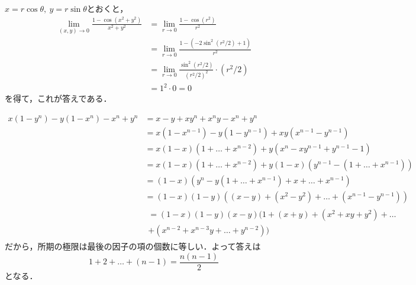 
\begin{tanswer}
    $x=r \cos \theta,~y=r\sin \theta$とおくと，
    \begin{align*}
        \lim_{(x,y)\to 0} \frac{1-\cos (x^2+y^2)}{x^2+y^2} & = \lim_{r \to 0} \frac{1-\cos (r^2)}{r^2}                       \\
                                                           & =\lim_{r \to 0} \frac{1-(-2\sin ^2 (r^2/2)+1)}{r^2}             \\
                                                           & =\lim_{r \to 0} \frac{\sin ^2 (r^2/2)}{(r^2/2)^2} \cdot (r^2/2) \\
                                                           & = 1^2 \cdot 0 =0
    \end{align*}
    を得て，これが答えである．
\end{tanswer}


\begin{tanswer}
    \begin{align*}
        x(1-y^n)-y(1-x^n)-x^n+y^n
         & = x-y+xy^n+x^ny-x^n+y^n                                     \\
         & = x(1-x^{n-1})-y(1-y^{n-1})+xy(x^{n-1}-y^{n-1})             \\
         & = x(1-x)(1+\dots+x^{n-2})+y(x^n-xy^{n-1}+y^{n-1}-1)         \\
         & = x(1-x)(1+\dots+x^{n-2})+y(1-x)(y^{n-1}-(1+\dots+x^{n-1})) \\
         & = (1-x)(y^n-y(1+\dots+x^{n-1})+x+\dots+x^{n-1})             \\
         & = (1-x)(1-y)((x-y)+(x^2-y^2)+\dots+(x^{n-1}-y^{n-1}))       \\
         &
        \begin{multlined}
            = (1-x)(1-y)(x-y)(1+(x+y)+(x^2+xy+y^2)+\dots \\
            +(x^{n-2}+x^{n-3}y+\dots+y^{n-2}))
        \end{multlined}
    \end{align*}
    だから，所期の極限は最後の因子の項の個数に等しい．よって答えは
    \[
        1+2+\ldots+(n-1) = \frac{n(n-1)}{2}
    \]
    となる．
\end{tanswer}





